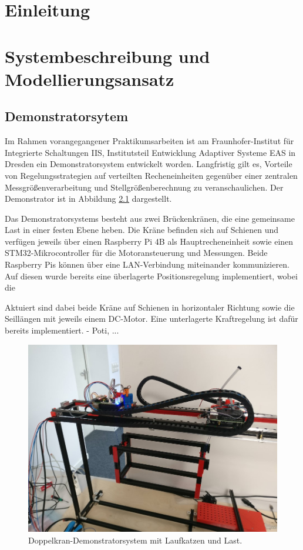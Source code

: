 \pagestyle{scrheadings}

\chapter{Einleitung}


\chapter{Systembeschreibung und Modellierungsansatz}

\section{Demonstratorsytem}
Im Rahmen vorangegangener Praktikumsarbeiten ist am Fraunhofer-Institut für Integrierte Schaltungen IIS, Institutsteil Entwicklung Adaptiver Systeme EAS \cite{fraunhoferIISEAS} in Dresden ein Demonstratorsystem entwickelt worden. Langfristig gilt es, Vorteile von Regelungsstrategien auf verteilten Recheneinheiten gegenüber einer zentralen Messgrößenverarbeitung und Stellgrößenberechnung zu veranschaulichen. Der Demonstrator ist in Abbildung \ref{fig:demonstrator_real} dargestellt.

Das Demonstratorsystems besteht aus zwei Brückenkränen, die eine gemeinsame Last in einer festen Ebene heben. Die Kräne befinden sich auf Schienen und verfügen jeweils über einen Raspberry Pi 4B als Hauptrecheneinheit sowie einen STM32-Mikrocontroller für die Motoransteuerung und Messungen. Beide Raspberry Pis können über eine LAN-Verbindung miteinander kommunizieren. Auf diesen wurde bereits eine überlagerte Positionsregelung implementiert, wobei die 

Aktuiert sind dabei beide Kräne auf Schienen in horizontaler Richtung sowie die Seillängen mit jeweils einem DC-Motor. Eine unterlagerte Kraftregelung ist dafür bereits implementiert.
- Poti, ...

\begin{figure}[ht]
	\centering
	\includegraphics[width=1 \textwidth]{Pictures/real_gantry.jpg}
	\caption{Doppelkran-Demonstratorsystem mit Laufkatzen und Last.}
	\label{fig:demonstrator_real}
\end{figure}

